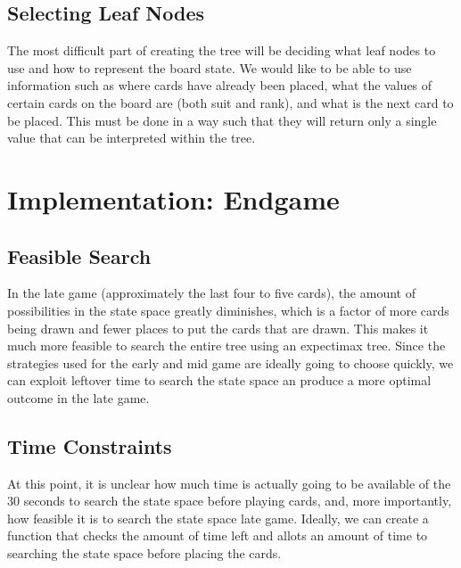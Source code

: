 \documentclass[twoside]{article}
\begin{document}
\begin{multicols}{2}
\subsection{Selecting Leaf Nodes}
The most difficult part of creating the tree will be deciding what leaf nodes to use and how to represent the board state. We would like to be able to use information such as where cards have already been placed, what the values of certain cards on the board are (both suit and rank), and what is the next card to be placed. This must be done in a way such that they will return only a single value that can be interpreted within the tree.


\section{Implementation: Endgame}
\subsection{Feasible Search}

In the late game (approximately the last four to five cards), the amount of possibilities in the state space greatly diminishes, which is a factor of more cards being drawn and fewer places to put the cards that are drawn. This makes it much more feasible to search the entire tree using an expectimax tree. Since the strategies used for the early and mid game are ideally going to choose quickly, we can exploit leftover time to search the state space an produce a more optimal outcome in the late game.

\subsection{Time Constraints}
At this point, it is unclear how much time is actually going to be available of the 30 seconds to search the state space before playing cards, and, more importantly, how feasible it is to search the state space late game. Ideally, we can create a function that checks the amount of time left and allots an amount of time to searching the state space before placing the cards.









\end{multicols}
\end{document}
